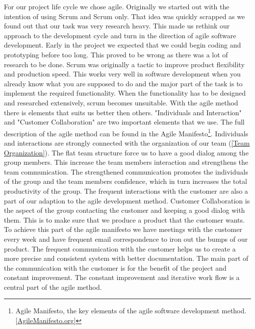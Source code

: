     For our project life cycle we chose agile. Originally we started out with the intention of using Scrum and Scrum only. That idea was quickly scrapped as we found out that our task was very research heavy. This made us rethink our approach to the development cycle and turn in the direction of agile software development.
    Early in the project we expected that we could begin coding and prototyping before too long. This proved to be wrong as there was a lot of research to be done. Scrum was originally a tactic to improve product flexibility and production speed. This works very well in software development when you already know what you are supposed to do and the major part of the task is to implement the required functionality. When the functionality has to be designed and researched extensively, scrum becomes unsuitable. 
    With the agile method there is elements that suits us better then others. "Individuals and Interaction" and "Customer Collaboration" are two important elements that we use. The full description of the agile method can be found in the Agile Manifesto\footnote
        {Agile Manifesto, the key elements of the agile software development method. [\href{http://http://agilemanifesto.org/}{AgileManifesto.org}]}.
    Individuals and interactions are strongly connected with the organization of our team (\ref{Team Organization}). The flat team structure force us to have a good dialog among the group members. This increase the team members interaction and strengthens the team communication. The strengthened communication promotes the individuals of the group and the team members confidence, which in turn increases the total productivity of the group. The frequent interactions with the customer are also a part of our adaption to the agile development method. 
    Customer Collaboration is the aspect of the group contacting the customer and keeping a good dialog with them. This is to make sure that we produce a product that the customer wants. To achieve this part of the agile manifesto we have meetings with the customer every week and have frequent email correspondence to iron out the bumps of our product. The frequent communication with the customer helps us to create a more precise and consistent system with better documentation. The main part of the communication with the customer is for the benefit of the project and constant improvement. The constant improvement and iterative work flow is a central part of the agile method. 

